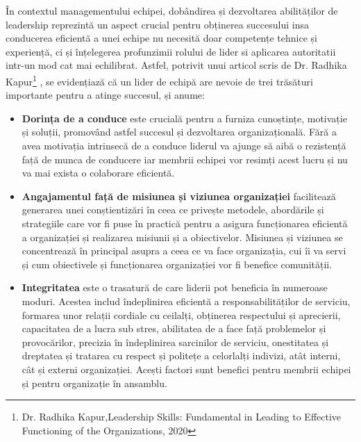 \documentclass[a4paper, 12pt]{article}
\begin{document}
	\quad În contextul managementului echipei, dobândirea și dezvoltarea abilităților de leadership reprezintă un aspect crucial pentru obținerea succesului insa conducerea eficientă a unei echipe nu necesită doar competențe tehnice și experiență, ci și înțelegerea profunzimii rolului de lider si aplicarea autoritatii intr-un mod cat mai echilibrat. Astfel, potrivit unui articol scris de Dr. Radhika Kapur\footnote{Dr. Radhika Kapur,Leadership Skills: Fundamental in Leading to Effective Functioning of the Organizations, 2020} , se evidențiază că un lider de echipă are nevoie de trei trăsături importante pentru a atinge succesul, și anume:

	\begin{itemize}
	\item \textbf {Dorința de a conduce} este crucială pentru a furniza cunoștințe, motivație și soluții, promovând astfel succesul și dezvoltarea organizațională. Fără a avea motivația intrinsecă de a conduce liderul va ajunge să aibă o rezistență față de munca de conducere iar membrii echipei vor resimți acest lucru și nu va mai exista o colaborare eficientă.

	 \item \textbf{Angajamentul față de misiunea și viziunea organizației} facilitează generarea unei conștientizări în ceea ce privește metodele, abordările și strategiile care vor fi puse în practică pentru a asigura funcționarea eficientă a organizației și realizarea misiunii și a obiectivelor. Misiunea și viziunea se concentrează în principal asupra a ceea ce va face organizația, cui îi va servi și cum obiectivele și funcționarea organizației vor fi benefice comunității. 

	 \item\textbf{Integritatea} este o trasatură de care liderii pot beneficia în numeroase moduri. Acestea includ îndeplinirea eficientă a responsabilităților de serviciu, formarea unor relații cordiale cu ceilalți, obținerea respectului și aprecierii, capacitatea de a lucra sub stres, abilitatea de a face față problemelor și provocărilor, precizia în îndeplinirea sarcinilor de serviciu, onestitatea și dreptatea și tratarea cu respect și politețe a celorlalți indivizi, atât interni, cât și externi organizației. Acești factori sunt benefici pentru membrii echipei și pentru organizație în ansamblu. 

\end{itemize}
\end{document}
